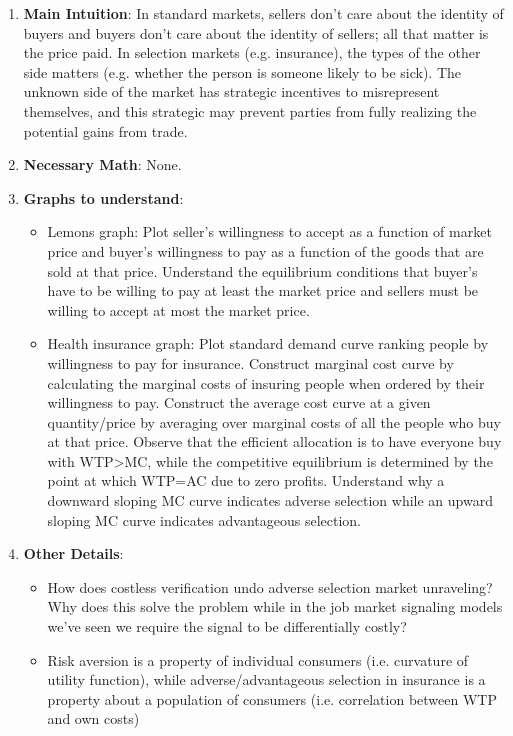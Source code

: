 \documentclass[letter,12pt]{article}
\begin{document}
\begin{enumerate}
	\item \textbf{Main Intuition}: In standard markets, sellers don't care about the identity of buyers and buyers don't care about the identity of sellers; all that matter is the price paid. In selection markets (e.g. insurance), the types of the other side matters (e.g. whether the person is someone likely to be sick). The unknown side of the market has strategic incentives to misrepresent themselves, and this strategic may prevent parties from fully realizing the potential gains from trade.
	\item \textbf{Necessary Math}: None.
	\item \textbf{Graphs to understand}: 
	\begin{itemize}
		\item Lemons graph: Plot seller's willingness to accept as a function of market price and buyer's willingness to pay as a function of the goods that are sold at that price. Understand the equilibrium conditions that buyer's have to be willing to pay at least the market price and sellers must be willing to accept at most the market price.
		\item Health insurance graph: Plot standard demand curve ranking people by willingness to pay for insurance. Construct marginal cost curve by calculating the marginal costs of insuring people when ordered by their willingness to pay. Construct the average cost curve at a given quantity/price by averaging over marginal costs of all the people who buy at that price. Observe that the efficient allocation is to have everyone buy with WTP>MC, while the competitive equilibrium is determined by the point at which WTP=AC due to zero profits. Understand why a downward sloping MC curve indicates adverse selection while an upward sloping MC curve indicates advantageous selection.
	\end{itemize}
	\item \textbf{Other Details}:
	\begin{itemize}
		\item How does costless verification undo adverse selection market unraveling? Why does this solve the problem while in the job market signaling models we've seen we require the signal to be differentially costly?
		\item Risk aversion is a property of individual consumers (i.e. curvature of utility function), while adverse/advantageous selection in insurance is a property about a population of consumers (i.e. correlation between WTP and own costs)
	\end{itemize} 
\end{enumerate}
\end{document}
